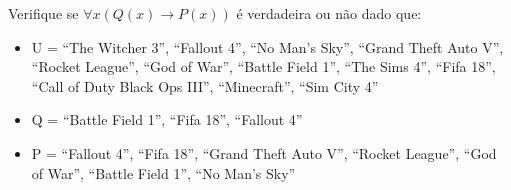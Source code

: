 
\question[10]

Verifique se $\forall x(Q(x) \rightarrow P(x))$ é verdadeira ou não dado que:

\begin{itemize}
	\item U = {``The Witcher 3'', ``Fallout 4'', ``No Man's Sky'', ``Grand Theft Auto V'', ``Rocket League'', ``God of War'', ``Battle Field 1'', ``The Sims 4'', ``Fifa 18'', ``Call of Duty Black Ops III'', ``Minecraft'', ``Sim City 4''}
    \item Q = {``Battle Field 1'', ``Fifa 18'', ``Fallout 4''}
    \item P = {``Fallout 4'', ``Fifa 18'', ``Grand Theft Auto V'', ``Rocket League'', ``God of War'', ``Battle Field 1'', ``No Man's Sky''}
\end{itemize}

\fillin[Verdadeiro][15cm]

